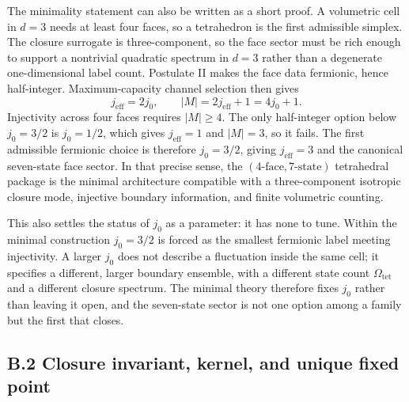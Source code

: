 \documentclass[11pt]{article}
\begin{document}
The minimality statement can also be written as a short proof. A volumetric cell in $d=3$ needs at least four faces, so a tetrahedron is the first admissible simplex. The closure surrogate is three-component, so the face sector must be rich enough to support a nontrivial quadratic spectrum in $d=3$ rather than a degenerate one-dimensional label count. Postulate II makes the face data fermionic, hence half-integer. Maximum-capacity channel selection then gives
\[
j_{\mathrm{eff}}=2j_0,
\qquad
|M|=2j_{\mathrm{eff}}+1=4j_0+1.
\]
Injectivity across four faces requires $|M|\ge 4$. The only half-integer option below $j_0=3/2$ is $j_0=1/2$, which gives $j_{\mathrm{eff}}=1$ and $|M|=3$, so it fails. The first admissible fermionic choice is therefore $j_0=3/2$, giving $j_{\mathrm{eff}}=3$ and the canonical seven-state face sector. In that precise sense, the $(4\text{-face},7\text{-state})$ tetrahedral package is the minimal architecture compatible with a three-component isotropic closure mode, injective boundary information, and finite volumetric counting.

This also settles the status of $j_0$ as a parameter: it has none to tune. Within the minimal construction $j_0=3/2$ is forced as the smallest fermionic label meeting injectivity. A larger $j_0$ does not describe a fluctuation inside the same cell; it specifies a different, larger boundary ensemble, with a different state count $\Omega_{\mathrm{tet}}$ and a different closure spectrum. The minimal theory therefore fixes $j_0$ rather than leaving it open, and the seven-state sector is not one option among a family but the first that closes.

\subsection*{B.2 Closure invariant, kernel, and unique fixed point}
\end{document}

